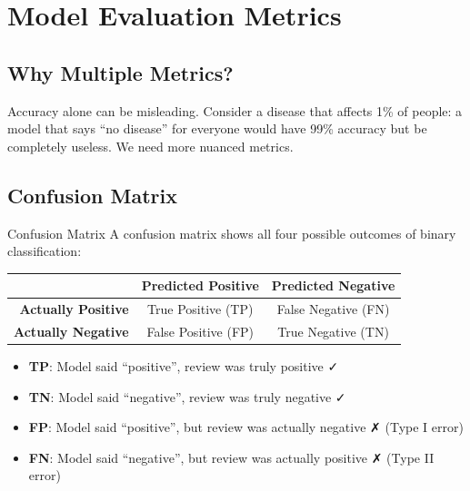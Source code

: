 \documentclass[12pt, a4paper]{article}
\begin{document}
\newpage

\section{Model Evaluation Metrics}

\subsection{Why Multiple Metrics?}

Accuracy alone can be misleading. Consider a disease that affects 1\% of people: a model that says ``no disease'' for everyone would have 99\% accuracy but be completely useless. We need more nuanced metrics.

\subsection{Confusion Matrix}

\begin{keyterm}{Confusion Matrix}
A confusion matrix shows all four possible outcomes of binary classification:

\medskip
\begin{center}
\begin{tabular}{r|cc}
 & \textbf{Predicted Positive} & \textbf{Predicted Negative} \\
\hline
\textbf{Actually Positive} & True Positive (TP) & False Negative (FN) \\
\textbf{Actually Negative} & False Positive (FP) & True Negative (TN) \\
\end{tabular}
\end{center}

\medskip
\begin{itemize}
  \item \textbf{TP}: Model said ``positive'', review was truly positive ✓
  \item \textbf{TN}: Model said ``negative'', review was truly negative ✓
  \item \textbf{FP}: Model said ``positive'', but review was actually negative ✗ (Type I error)
  \item \textbf{FN}: Model said ``negative'', but review was actually positive ✗ (Type II error)
\end{itemize}
\end{keyterm}
\end{document}
